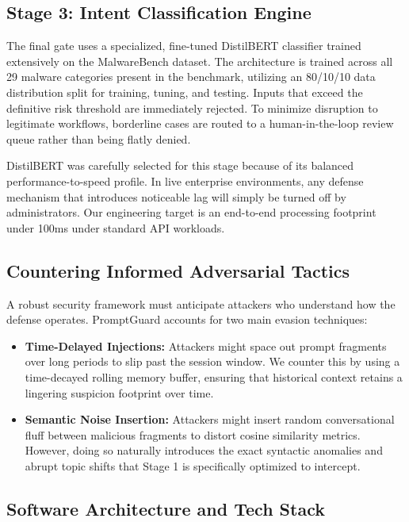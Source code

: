 \documentclass[conference]{IEEEtran}
\begin{document}
\subsection{\textbf{Stage 3: Intent Classification Engine}}

The final gate uses a specialized, fine-tuned DistilBERT classifier trained extensively on the MalwareBench dataset. The architecture is trained across all 29 malware categories present in the benchmark, utilizing an 80/10/10 data distribution split for training, tuning, and testing. Inputs that exceed the definitive risk threshold are immediately rejected. To minimize disruption to legitimate workflows, borderline cases are routed to a human-in-the-loop review queue rather than being flatly denied.

DistilBERT was carefully selected for this stage because of its balanced performance-to-speed profile. In live enterprise environments, any defense mechanism that introduces noticeable lag will simply be turned off by administrators. Our engineering target is an end-to-end processing footprint under 100ms under standard API workloads.

\subsection{\textbf{Countering Informed Adversarial Tactics}}

A robust security framework must anticipate attackers who understand how the defense operates. PromptGuard accounts for two main evasion techniques:

\begin{itemize}
\item \textbf{Time-Delayed Injections:} Attackers might space out prompt fragments over long periods to slip past the session window. We counter this by using a time-decayed rolling memory buffer, ensuring that historical context retains a lingering suspicion footprint over time.

\item \textbf{Semantic Noise Insertion:} Attackers might insert random conversational fluff between malicious fragments to distort cosine similarity metrics. However, doing so naturally introduces the exact syntactic anomalies and abrupt topic shifts that Stage 1 is specifically optimized to intercept.
\end{itemize}

\subsection{\textbf{Software Architecture and Tech Stack}}
\end{document}
